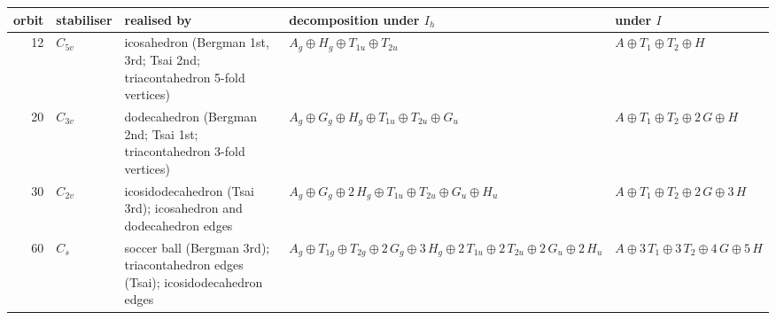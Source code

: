 \begin{tabular}{rllll}
\hline
orbit & stabiliser & realised by & decomposition under $I_h$ & under $I$ \\
\hline
12 & $C_{5v}$ & icosahedron (Bergman 1st, 3rd; Tsai 2nd; triacontahedron 5-fold vertices) & $A_g \oplus H_g \oplus T_{1u} \oplus T_{2u}$ & $A \oplus T_1 \oplus T_2 \oplus H$ \\
20 & $C_{3v}$ & dodecahedron (Bergman 2nd; Tsai 1st; triacontahedron 3-fold vertices) & $A_g \oplus G_g \oplus H_g \oplus T_{1u} \oplus T_{2u} \oplus G_u$ & $A \oplus T_1 \oplus T_2 \oplus 2\,G \oplus H$ \\
30 & $C_{2v}$ & icosidodecahedron (Tsai 3rd); icosahedron and dodecahedron edges & $A_g \oplus G_g \oplus 2\,H_g \oplus T_{1u} \oplus T_{2u} \oplus G_u \oplus H_u$ & $A \oplus T_1 \oplus T_2 \oplus 2\,G \oplus 3\,H$ \\
60 & $C_{s}$ & soccer ball (Bergman 3rd); triacontahedron edges (Tsai); icosidodecahedron edges & $A_g \oplus T_{1g} \oplus T_{2g} \oplus 2\,G_g \oplus 3\,H_g \oplus 2\,T_{1u} \oplus 2\,T_{2u} \oplus 2\,G_u \oplus 2\,H_u$ & $A \oplus 3\,T_1 \oplus 3\,T_2 \oplus 4\,G \oplus 5\,H$ \\
\hline
\end{tabular}
